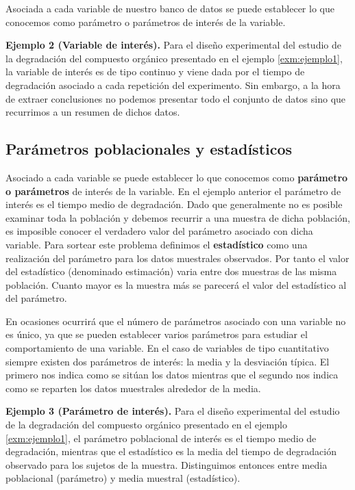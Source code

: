 \documentclass[
]{book}
\begin{document}
Asociada a cada variable de nuestro banco de datos se puede establecer lo que conocemos como parámetro o parámetros de interés de la variable.

\textbf{Ejemplo 2 (Variable de interés).} Para el diseño experimental del estudio de la degradación del compuesto orgánico presentado en el ejemplo \ref{exm:ejemplo1}, la variable de interés es de tipo continuo y viene dada por el tiempo de degradación asociado a cada repetición del experimento. Sin embargo, a la hora de extraer conclusiones no podemos presentar todo el conjunto de datos sino que recurrimos a un resumen de dichos datos.

\hypertarget{paruxe1metros-poblacionales-y-estaduxedsticos}{%
\subsection{Parámetros poblacionales y estadísticos}\label{paruxe1metros-poblacionales-y-estaduxedsticos}}

Asociado a cada variable se puede establecer lo que conocemos como \textbf{parámetro o parámetros} de interés de la variable. En el ejemplo anterior el parámetro de interés es el tiempo medio de degradación. Dado que generalmente no es posible examinar toda la población y debemos recurrir a una muestra de dicha población, es imposible conocer el verdadero valor del parámetro asociado con dicha variable. Para sortear este problema definimos el \textbf{estadístico} como una realización del parámetro para los datos muestrales observados. Por tanto el valor del estadístico (denominado estimación) varia entre dos muestras de las misma población. Cuanto mayor es la muestra más se parecerá el valor del estadístico al del parámetro.

En ocasiones ocurrirá que el número de parámetros asociado con una variable no es único, ya que se pueden establecer varios parámetros para estudiar el comportamiento de una variable. En el caso de variables de tipo cuantitativo siempre existen dos parámetros de interés: la media y la desviación típica. El primero nos indica como se sitúan los datos mientras que el segundo nos indica como se reparten los datos muestrales alrededor de la media.

\textbf{Ejemplo 3 (Parámetro de interés).} Para el diseño experimental del estudio de la degradación del compuesto orgánico presentado en el ejemplo \ref{exm:ejemplo1}, el parámetro poblacional de interés es el tiempo medio de degradación, mientras que el estadístico es la media del tiempo de degradación observado para los sujetos de la muestra. Distinguimos entonces entre media poblacional (parámetro) y media muestral (estadístico).
\end{document}
